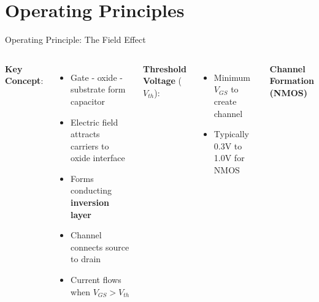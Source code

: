 \documentclass[10pt, aspectratio=169]{beamer}
\begin{document}
\section{Operating Principles}

\begin{frame}{Operating Principle: The Field Effect}
    
    \begin{columns}[t]
        \textbf{Key Concept}:
        \begin{itemize}
            \item Gate - oxide - substrate form capacitor
            \item Electric field attracts carriers to oxide interface
            \item Forms conducting \textbf{inversion layer}
            \item Channel connects source to drain
            \item Current flows when $V_{GS} > V_{th}$
        \end{itemize}
        
        
        \textbf{Threshold Voltage} ($V_{th}$):
        \begin{itemize}
            \item Minimum $V_{GS}$ to create channel
            \item Typically 0.3V to 1.0V for NMOS
        \end{itemize}
        
        \begin{center}
        \textbf{Channel Formation (NMOS)}
        
        \vspace{0.2cm}
        
\end{center}
\end{columns}
\end{frame}
\end{document}
